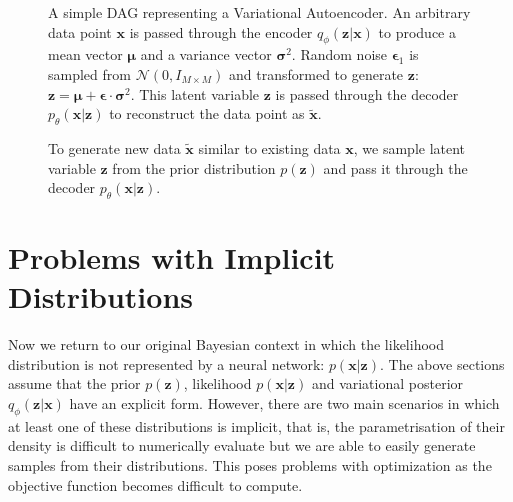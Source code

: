 \documentclass[honours,12pt]{unswthesis}
\numberwithin{equation}{section}
\theoremstyle{definition}
\begin{document}
\begin{figure}[h]
  \centering
   \caption{\small A simple DAG representing a Variational Autoencoder. An arbitrary data point $\bm{x}$ is passed through the encoder $q_\phi(\bm{z}|\bm{x})$ to produce a mean vector $\bm{\mu}$ and a variance vector $\bm{\sigma}^2$. Random noise $\bm{\epsilon}_1$ is sampled from $\mathcal{N}(0,I_{M\times M})$ and transformed to generate $\bm{z}$: $\bm{z}=\bm{\mu}+\bm{\epsilon}\cdot \bm{\sigma}^2$. This latent variable $\bm{z}$ is passed through the decoder $p_\theta(\bm{x}|\bm{z})$ to reconstruct the data point as $\tilde{\bm{x}}$.}
   \label{fig:3.3}
\end{figure}
\begin{figure}[h]
  \centering
   \caption{\small To generate new data $\tilde{\bm{x}}$ similar to existing data $\bm{x}$, we sample latent variable $\bm{z}$ from the prior distribution $p(\bm{z})$ and pass it through the decoder $p_\theta(\bm{x}|\bm{z})$.}
   \label{fig:3.4}
\end{figure}
\section{Problems with Implicit Distributions}\label{sec:3.8}
Now we return to our original Bayesian context in which the likelihood distribution is not represented by a neural network: $p(\bm{x}|\bm{z})$. The above sections assume that the prior $p(\bm{z})$, likelihood $p(\bm{x}|\bm{z})$ and variational posterior $q_\phi(\bm{z}|\bm{x})$ have an explicit form. However, there are two main scenarios in which at least one of these distributions is implicit, that is, the parametrisation of their density is difficult to numerically evaluate but we are able to easily generate samples from their distributions. This poses problems with optimization as the objective function becomes difficult to compute. 
\end{document}

